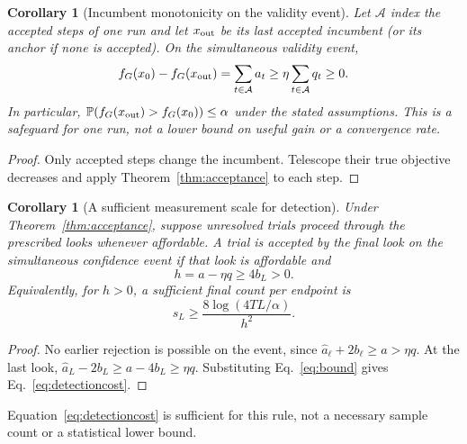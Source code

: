 \documentclass[11pt]{article}
\newcommand{\Prb}{\mathbb P}
\newtheorem{corollary}[theorem]{Corollary}
\begin{document}
\begin{corollary}[Incumbent monotonicity on the validity event]
\label{cor:path}
Let $\mathcal A$ index the accepted steps of one run and let
$x_{\rm out}$ be its last accepted incumbent (or its anchor if none is
accepted). On the simultaneous validity event,
\begin{equation}
 f_G(x_0)-f_G(x_{\rm out})
 =\sum_{t\in\mathcal A}a_t
 \ge\eta\sum_{t\in\mathcal A}q_t\ge0.
 \label{eq:pathgain}
\end{equation}
In particular, $\Prb(f_G(x_{\rm out})>f_G(x_0))\le\alpha$ under the
stated assumptions. This is a safeguard for one run, not a lower bound
on useful gain or a convergence rate.
\end{corollary}
\begin{proof}
Only accepted steps change the incumbent. Telescope their true objective
decreases and apply Theorem~\ref{thm:acceptance} to each step.
\end{proof}

\begin{corollary}[A sufficient measurement scale for detection]
\label{cor:detection}
Under Theorem~\ref{thm:acceptance}, suppose unresolved trials proceed through
the prescribed looks whenever affordable. A trial is accepted by the final
look on the simultaneous confidence event if that look is affordable and
\begin{equation}
 h=a-\eta q\ge4b_L>0.
 \label{eq:detectability}
\end{equation}
Equivalently, for $h>0$, a sufficient final count per endpoint is
\begin{equation}
 s_L\ge\frac{8\log(4TL/\alpha)}{h^2}.
 \label{eq:detectioncost}
\end{equation}
\end{corollary}
\begin{proof}
No earlier rejection is possible on the event, since
$\widehat a_\ell+2b_\ell\ge a>\eta q$. At the last look,
$\widehat a_L-2b_L\ge a-4b_L\ge\eta q$. Substituting
Eq.~\eqref{eq:bound} gives Eq.~\eqref{eq:detectioncost}.
\end{proof}
Equation~\eqref{eq:detectioncost} is sufficient for this rule, not a necessary
sample count or a statistical lower bound.
\end{document}
